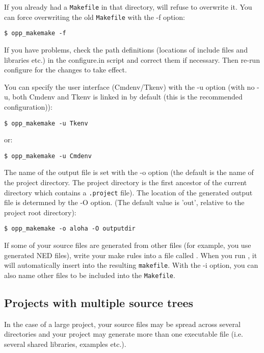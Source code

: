 If you already had a \texttt{Makefile} in that directory, 
will refuse to overwrite it. You can force overwriting the old \texttt{Makefile}
with the -f option:

\begin{verbatim}
$ opp_makemake -f
\end{verbatim}

If you have problems, check the path definitions (locations of include
files and libraries etc.) in the configure.in script
and correct them if necessary. Then re-run configure for the changes
to take effect.

You can specify the user interface (Cmdenv/Tkenv) with the -u option
(with no -u, both Cmdenv and Tkenv is linked in by default (this is the
recommended configuration)):

\begin{verbatim}
$ opp_makemake -u Tkenv
\end{verbatim}

or:

\begin{verbatim}
$ opp_makemake -u Cmdenv
\end{verbatim}

The name of the output file is set with the -o
option (the default is the name of the project directory. The project
directory is the first ancestor of the current directory which
contains a \texttt{.project} file). The location of the generated 
output file is determned by the -O option. (The default value is 'out',
relative to the project root directory):

\begin{verbatim}
$ opp_makemake -o aloha -O outputdir
\end{verbatim}

If some of your source files are generated from other files (for
example, you use generated NED files), write your make rules
into a file called . When you run , it
will automatically insert  into the resulting \texttt{makefile}.
With the -i option, you can also name other files to be included into the
\texttt{Makefile}.


\subsection{Projects with multiple source trees}

In the case of a large project, your source files may be spread across
several directories and your project may generate more than one executable
file (i.e. several shared libraries, examples etc.).

